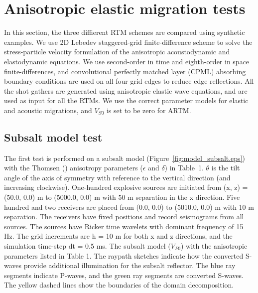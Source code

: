 \documentclass[manuscript,ulem,graphix,revised]{geophysics}
\begin{document}
\section{Anisotropic elastic migration tests}
\indent\indent
In this section, the three diffierent RTM schemes are compared using synthetic examples. We use 2D Lebedev staggered-grid finite-difference scheme \citep{vadim10} to solve the stress-particle velocity formulation of the \marginnote{[19]}anisotropic acoustodynamic and elastodynamic equations. We use second-order in time and eighth-order in space finite-differences, and convolutional perfectly matched layer (CPML) absorbing boundary conditions \citep{komatitsch07} are used on all four grid edges 
to reduce edge reflections. All the shot gathers are generated using anisotropic elastic wave equations, and are used as input for all the RTMs. 
We use the correct parameter models for elastic and acoustic migrations, and $V_{S0}$ is set to be zero for ARTM. \marginnote{[21,5]}

\subsection{Subsalt model test}
\indent\indent
The first test is performed on a subsalt model (Figure~\ref{fig:model_subsalt.eps}) with the Thomsen (\citeyear{thomsen86}) anisotropy parameters ($\epsilon$ and $\delta$) in Table~1. $\theta$ is the tilt angle of the axis of symmetry with reference to the vertical direction (and increasing clockwise).
One-hundred explosive sources are initiated from (x, z) = (50.0, 0.0) m to  (5000.0, 0.0) m with 50 m separation in the x direction. \marginnote{[22]}Five hundred and two receivers are placed from (0.0, 0.0) to (5010.0, 0.0) m with 10 m separation. The receivers have fixed positions and record seismograms from all sources. The sources have Ricker time wavelets with dominant frequency of 15 Hz. 
The grid increments are h = 10 m for both x and z directions, and the simulation time-step dt = 0.5 ms. \marginnote{[23]}
{
The subsalt model ($V_{P0}$) with the anisotropic parameters listed in Table 1. The raypath sketches indicate how the converted S-waves provide additional illumination for the subsalt reflector. The blue ray segments indicate P-waves, and the green ray segments are converted S-waves. The yellow dashed lines show the boundaries of the domain decomposition. 
}

\end{document}

